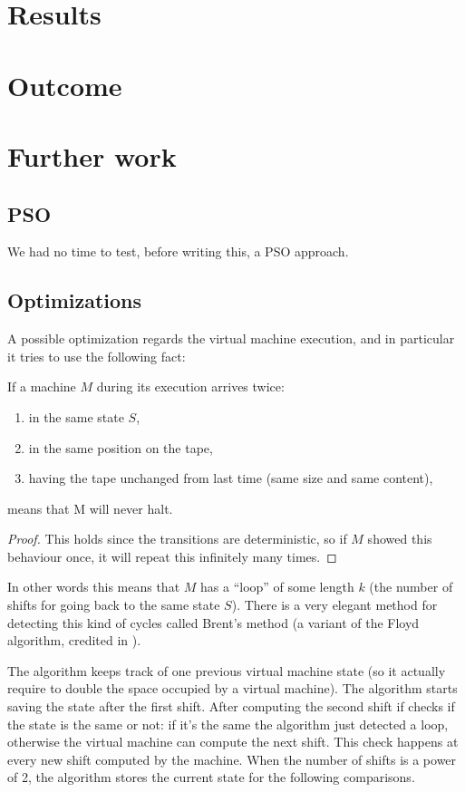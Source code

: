 \documentclass{report}
\begin{document}
\chapter{Results}
\label{chap:results}


\chapter{Outcome}
\label{chap:outcome}


\chapter{Further work}
\label{chap:fwork}

\section{PSO}
We had no time to test, before writing this, a PSO approach.

\section{Optimizations}
A possible optimization regards the virtual machine execution, and in particular it tries to use the following fact:

\begin{Thm}
If a machine $M$ during its execution arrives twice:
\begin{enumerate}
\item in the same state $S$,
\item in the same position on the tape,
\item having the tape unchanged from last time (same size and same content),
\end{enumerate}
means that M will never halt.
\end{Thm}
\begin{proof}
This holds since the transitions are deterministic, so if $M$ showed this behaviour once, it will repeat this infinitely many times.
\end{proof}

In other words this means that $M$ has a ``loop'' of some length $k$ (the number of shifts for going back to the same state $S$). There is a very elegant method for detecting this kind of cycles called Brent's method \cite{brent} (a variant of the Floyd algorithm, credited in \cite{knuth}).

The algorithm keeps track of one previous virtual machine state (so it actually require to double the space occupied by a virtual machine). The algorithm starts saving the state after the first shift. After computing the second shift if checks if the state is the same or not: if it's the same the algorithm just detected a loop, otherwise the virtual machine can compute the next shift. This check happens at every new shift computed by the machine. When the number of shifts is a power of 2, the algorithm stores the current state for the following comparisons.
\end{document}
